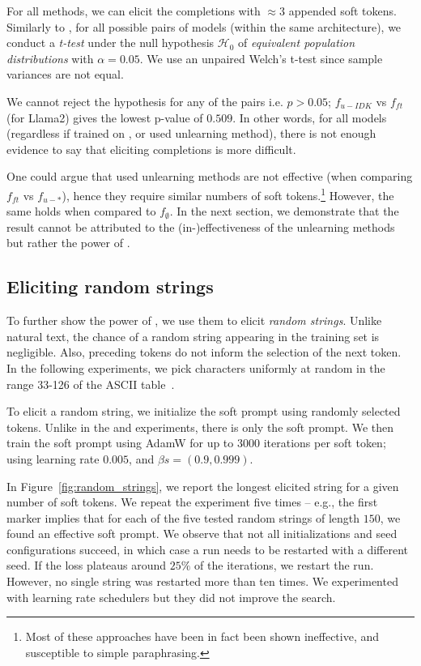 For all methods, we can elicit the completions with $\approx 3$ appended soft tokens.
Similarly to \whp, for all possible pairs of models (within the same architecture), we conduct a \emph{t-test} under the null hypothesis $\mathcal{H}_0$ of \emph{equivalent population distributions} with $\alpha=0.05$.
We use an unpaired Welch's t-test since sample variances are not equal.

We cannot reject the hypothesis for any of the pairs i.e. $p>0.05$; $f_{u-IDK}$ vs $f_{ft}$ (for Llama2) gives the lowest p-value of $0.509$.
In other words, for all models (regardless if trained on \tofu, or used unlearning method), there is not enough evidence to say that eliciting completions is more difficult.

One could argue that used unlearning methods are not effective (when comparing $f_{ft}$ vs $f_{u-*}$), hence they require similar numbers of soft tokens.\footnote{Most of these approaches have been in fact been shown ineffective, and susceptible to simple paraphrasing.}
However, the same holds when compared to $f_\emptyset$.
In the next section, we demonstrate that the result cannot be attributed to the (in-)effectiveness of the unlearning methods but rather the power of \sta.

\subsection{Eliciting random strings}\label{sec:eval:random-strings}

To further show the power of , we use them to elicit \emph{random strings}.
Unlike natural text, the chance of a random string appearing in the training set is negligible.
Also, preceding tokens do not inform the selection of the next token. 
In the following experiments, we pick characters uniformly at random in the range 33-126 of the ASCII table~\cite{asciitable}.

To elicit a random string, we initialize the soft prompt using randomly selected tokens.
Unlike in the \whp and \tofu experiments, there is only the soft prompt.
We then train the soft prompt using AdamW for up to $3000$ iterations per soft token; using learning rate $0.005$, and $\beta{s}=(0.9, 0.999)$.

In Figure~\ref{fig:random_strings}, we report the longest elicited string for a given number of soft tokens.
We repeat the experiment five times -- e.g., the first marker implies that for each of the five tested random strings of length $150$, we found an effective soft prompt.
We observe that not all initializations and seed configurations succeed, in which case a run needs to be restarted with a different seed.
If the loss plateaus around $25\%$ of the iterations, we restart the run.
However, no single string was restarted more than ten times.
We experimented with learning rate schedulers but they did not improve the search.

